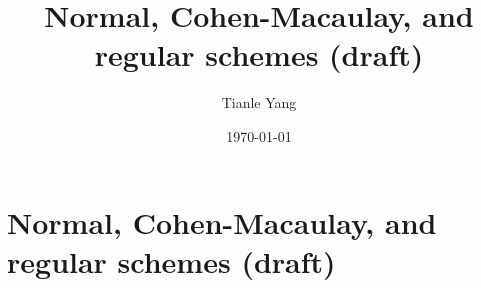 \documentclass{noteformyself}
\title{Normal, Cohen-Macaulay, and regular schemes (draft)}
\author{Tianle Yang}
\date{\today}
\begin{document}
    \maketitle

    \section{Normal, Cohen-Macaulay, and regular schemes (draft)}


\end{document}

